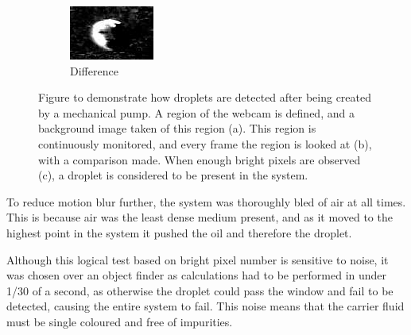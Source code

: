 \documentclass{physics_article_B}
\begin{document}
\begin{figure}[H]
\begin{subfigure}[b]{0.3\textwidth}
                            \includegraphics[width=\textwidth]{Figures/DropFinder/DropFinder3.eps}
                            \caption{Difference}
                            \label{fig:detector:diff}
                        \end{subfigure}
                        \caption{Figure to demonstrate how droplets are detected after being created by a mechanical pump. A region of the webcam is defined, and a background image taken of this region (a). This region is continuously monitored, and every frame the region is looked at (b), with a comparison made. When enough bright pixels are observed (c), a droplet is considered to be present in the system.}\label{fig:detector}
                    \end{figure}
            
            To reduce motion blur further, the system was thoroughly bled of air at all times. This is because air was the least dense medium present, and as it moved to the highest point in the system it pushed the oil and therefore the droplet. 
            
            Although this logical test based on bright pixel number is sensitive to noise, it was chosen over an object finder as calculations had to be performed in under 1/30 of a second, as otherwise the droplet could pass the window and fail to be detected, causing the entire system to fail. This noise means that the carrier fluid must be single coloured and free of impurities. 
            
\end{document}
